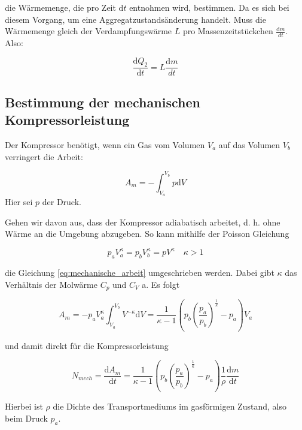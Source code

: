 die Wärmemenge, die pro Zeit $\mathup{d}t$ entnohmen wird, bestimmen.
Da es sich bei diesem Vorgang, um eine Aggregatzustandsänderung handelt.
Muss die Wärmemenge gleich der Verdampfungswärme $L$ pro Massenzeitstückchen $\frac{\mathup{d}m}{dt}$.
Also:

\begin{equation*}
\frac{\mathup{d} Q_2}{\mathup{d} t}=L\frac{\mathup{d}m}{dt}
\end{equation*}

\subsection{Bestimmung der mechanischen Kompressorleistung}

Der Kompressor benötigt, wenn ein Gas vom Volumen $V_a$ auf das Volumen $V_b$ verringert
die Arbeit:

\begin{equation}
\label{eq:mechanische_arbeit}
A_m=-\int_{V_a}^{V_b}p\mathup{d}V
\end{equation}
Hier sei $p$ der Druck.

Gehen wir davon aus, dass der Kompressor adiabatisch arbeitet,
d. h. ohne Wärme an die Umgebung abzugeben. 
So kann mithilfe der Poisson Gleichung

\begin{equation*}
p_aV^{\kappa}_a=p_bV^{\kappa}_b=pV^{\kappa} \quad \kappa>1
\end{equation*}

die Gleichung \eqref{eq:mechanische_arbeit} umgeschrieben werden.
Dabei gibt $\kappa$ das Verhältnis der Molwärme $C_p$ und $C_V$ a.
Es folgt

\begin{equation*}
A_m=-p_aV_a^{\kappa}\int_{V_a}^{V_b}V^{-\kappa}\mathup{d}V=\frac{1}{\kappa-1}\left(p_b\left(\frac{p_a}{p_b}\right)^{\frac{1}{k}}-p_a\right)V_a
\end{equation*}

und damit direkt für die Kompressorleistung

\begin{equation*}
N_{mech}=\frac{\mathup{d}A_m}{\mathup{d}t}=\frac{1}{\kappa-1}\left(p_b\left(\frac{p_a}{p_b}\right)^{\frac{1}{\kappa}}-p_a\right)\frac{1}{\rho}\frac{\mathup{d}m}{\mathup{d}t}
\end{equation*}

Hierbei ist $\rho$ die Dichte des Transportmediums im gasförmigen Zustand, also beim Druck $p_a$.
